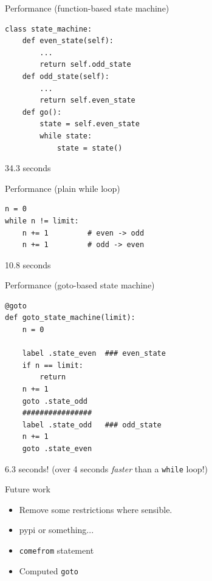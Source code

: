\documentclass{beamer}
\begin{document}
\begin{frame}[fragile]{Performance (function-based state machine)}

\begin{verbatim}
class state_machine:
    def even_state(self):
        ...
        return self.odd_state
    def odd_state(self):
        ...
        return self.even_state
    def go():
        state = self.even_state
        while state:
            state = state()
\end{verbatim}
34.3 seconds
\end{frame}


\begin{frame}[fragile]{Performance (plain while loop)}
\begin{verbatim}
n = 0
while n != limit:
    n += 1         # even -> odd
    n += 1         # odd -> even
\end{verbatim}
10.8 seconds
\end{frame}

\begin{frame}[fragile]{Performance (goto-based state machine)}
\begin{verbatim}
@goto
def goto_state_machine(limit):
    n = 0

    label .state_even  ### even_state
    if n == limit:
        return
    n += 1
    goto .state_odd
    ################
    label .state_odd   ### odd_state
    n += 1
    goto .state_even
\end{verbatim}
\pause
\alert{6.3 seconds!}  (over 4 seconds \emph{faster} than a \verb!while! loop!)
\end{frame}

\begin{frame}[fragile]{Future work}

\begin{itemize}
\item Remove some restrictions where sensible.
\item pypi or something...
\item \verb!comefrom! statement
\item Computed \verb!goto!
\end{itemize}

\end{frame}
\end{document}
